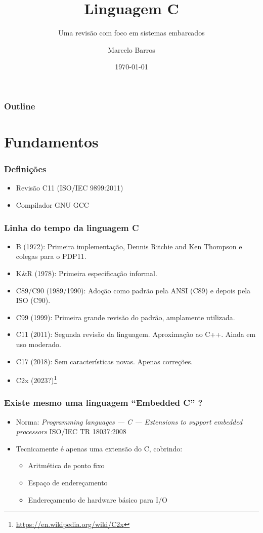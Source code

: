 \documentclass{beamer}
\title{Linguagem C}
\subtitle{Uma revisão com foco em sistemas embarcados}
\author{Marcelo Barros}
\institute{UFU/FEELT}
\date{\today}
\begin{document}
\begin{frame}
\titlepage
\end{frame}

\begin{frame}
\frametitle{Outline}
\tableofcontents
\end{frame}

\section{Fundamentos}

\begin{frame}
	\frametitle{Definições}
	\begin{itemize}
		\item Revisão C11 (ISO/IEC 9899:2011)
		\item Compilador GNU GCC
	\end{itemize}
\end{frame}

\begin{frame}
	\frametitle{Linha do tempo da linguagem C}
	\begin{itemize}
		\item B (1972): Primeira implementação, Dennis Ritchie and Ken Thompson e colegas para o PDP11.
		\item K\&R (1978): Primeira especificação informal.
		\item C89/C90 (1989/1990): Adoção como padrão pela ANSI (C89) e depois pela ISO (C90).
		\item C99 (1999): Primeira grande revisão do padrão, amplamente utilizada.
		\item C11 (2011): Segunda revisão da linguagem. Aproximação ao C++. Ainda em uso moderado.
		\item C17 (2018): Sem características novas. Apenas correções.
		\item C2x (2023?)\footnote{\url{https://en.wikipedia.org/wiki/C2x}}
	\end{itemize}
\end{frame}

\begin{frame}
	\frametitle{Existe mesmo uma linguagem ``Embedded C'' ?}
	\begin{itemize}
		\item Norma: \textit{Programming languages — C — Extensions to support embedded processors}
		ISO/IEC TR 18037:2008
		\item Tecnicamente é apenas uma extensão do C, cobrindo:
	\begin{itemize}
		\item Aritmética de ponto fixo
		\item Espaço de endereçamento
		\item Endereçamento de hardware básico para I/O
	\end{itemize}
	\end{itemize}
\end{frame}
\end{document}
